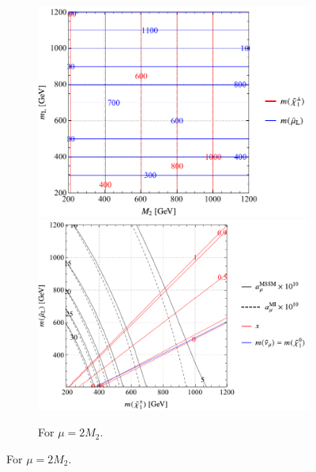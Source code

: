 \documentclass[a4paper,10pt,captions=tableheading,DIV=14]{scrartcl}
\numberwithin{equation}{section}
\begin{document}
\begin{figure}[p]
\begin{subfigure}[b]{\textwidth}
 \includegraphics[scale=0.6]{../plots/plot_spectrum_tab2_massplot.pdf}
\hfill
 \includegraphics[scale=0.6]{../plots/plot_spectrum_tab2_physplot.pdf}
\caption{\label{fig:spectra-tab1} For $\mu=2M_2$.}
\end{subfigure}

\vspace{1em}


\end{figure}
\end{document}
